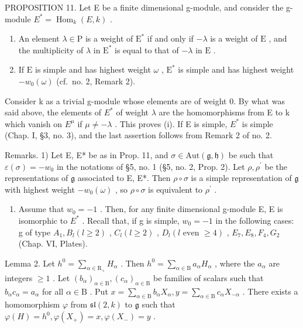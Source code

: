 PROPOSITION 11. Let E be a finite dimensional g-module, and consider the g-module \(E^{*} = \operatorname{Hom}_{k}(E, k)\) .

\begin{enumerate}
\def\labelenumi{(\roman{enumi})}
\item
  An element \(\lambda \in \mathrm{P}\) is a weight of \(\mathrm{E}^*\) if and only if \(-\lambda\) is a weight of \(\mathrm{E}\) , and the multiplicity of \(\lambda\) in \(\mathrm{E}^*\) is equal to that of \(-\lambda\) in \(\mathrm{E}\) .
\item
  If \(\mathrm{E}\) is simple and has highest weight \(\omega\) , \(\mathrm{E}^*\) is simple and has highest weight \(-w_0(\omega)\) (cf.~no. 2, Remark 2).
\end{enumerate}

Consider k as a trivial g-module whose elements are of weight 0. By what was said above, the elements of \(E^{*}\) of weight \(\lambda\) are the homomorphisms from E to k which vanish on \(E^{\mu}\) if \(\mu \neq -\lambda\) . This proves (i). If E is simple, \(E^{*}\) is simple (Chap. I, §3, no. 3), and the last assertion follows from Remark 2 of no. 2.

Remarks. 1) Let E, E* be as in Prop. 11, and \(\sigma \in \mathrm{Aut}(\mathfrak{g},\mathfrak{h})\) be such that \(\varepsilon (\sigma) = -w_0\) in the notations of §5, no. 1 (§5, no. 2, Prop. 2). Let \(\rho ,\rho^{\prime}\) be the representations of \(\mathfrak{g}\) associated to E, E*. Then \(\rho \circ \sigma\) is a simple representation of \(\mathfrak{g}\) with highest weight \(-w_{0}(\omega)\) , so \(\rho \circ \sigma\) is equivalent to \(\rho^{\prime}\) .

\begin{enumerate}
\def\labelenumi{\arabic{enumi})}
\setcounter{enumi}{1}
\tightlist
\item
  Assume that \(w_{0} = -1\) . Then, for any finite dimensional g-module E, E is isomorphic to \(E^{*}\) . Recall that, if g is simple, \(w_{0} = -1\) in the following cases: g of type \(A_{1}, B_{l} (l \geq 2)\) , \(C_{l} (l \geq 2)\) , \(D_{l} (l \text{ even } \geq 4)\) , \(E_{7}, E_{8}, F_{4}, G_{2}\) (Chap. VI, Plates).
\end{enumerate}

Lemma 2. Let \(h^0 = \sum_{\alpha \in \mathrm{R}_{+}} H_\alpha\) . Then \(h^0 = \sum_{\alpha \in \mathrm{B}} a_\alpha H_\alpha\) , where the \(a_\alpha\) are integers \(\geq 1\) . Let \((b_\alpha)_{\alpha \in \mathrm{B}}, (c_\alpha)_{\alpha \in \mathrm{B}}\) be families of scalars such that \(b_\alpha c_\alpha = a_\alpha\) for all \(\alpha \in \mathrm{B}\) . Put \(x = \sum_{\alpha \in \mathrm{B}} b_\alpha X_\alpha, y = \sum_{\alpha \in \mathrm{B}} c_\alpha X_{-\alpha}\) . There exists a homomorphism \(\varphi\) from \(\mathfrak{sl}(2,k)\) to \(\mathfrak{g}\) such that \(\varphi(H) = h^0, \varphi(X_+) = x, \varphi(X_-) = y\) .

